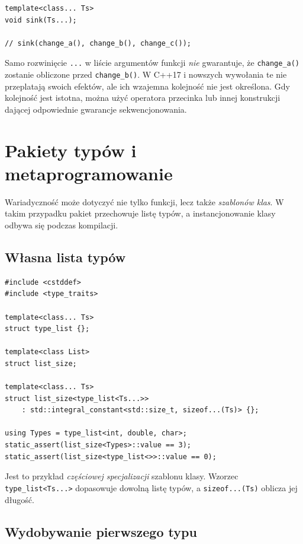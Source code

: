\begin{lstlisting}
template<class... Ts>
void sink(Ts...);

// sink(change_a(), change_b(), change_c());
\end{lstlisting}

Samo rozwinięcie \texttt{...} w liście argumentów funkcji
\emph{nie} gwarantuje, że \texttt{change\_a()} zostanie obliczone
przed \texttt{change\_b()}. W C++17 i nowszych wywołania
te nie przeplatają swoich efektów, ale ich wzajemna kolejność
nie jest określona. Gdy kolejność jest istotna, można użyć
operatora przecinka lub innej konstrukcji dającej odpowiednie
gwarancje sekwencjonowania.

\section{Pakiety typów i metaprogramowanie}
\label{sec:variadic-type-list}

Wariadyczność może dotyczyć nie tylko funkcji, lecz także
\emph{szablonów klas}. W takim przypadku pakiet przechowuje
listę typów, a instancjonowanie klasy odbywa się podczas kompilacji.

\subsection{Własna lista typów}

\begin{lstlisting}
#include <cstddef>
#include <type_traits>

template<class... Ts>
struct type_list {};

template<class List>
struct list_size;

template<class... Ts>
struct list_size<type_list<Ts...>>
    : std::integral_constant<std::size_t, sizeof...(Ts)> {};

using Types = type_list<int, double, char>;
static_assert(list_size<Types>::value == 3);
static_assert(list_size<type_list<>>::value == 0);
\end{lstlisting}

Jest to przykład \emph{częściowej specjalizacji} szablonu klasy.
Wzorzec \texttt{type\_list<Ts...>} dopasowuje dowolną listę
typów, a \texttt{sizeof...(Ts)} oblicza jej długość.

\subsection{Wydobywanie pierwszego typu}

